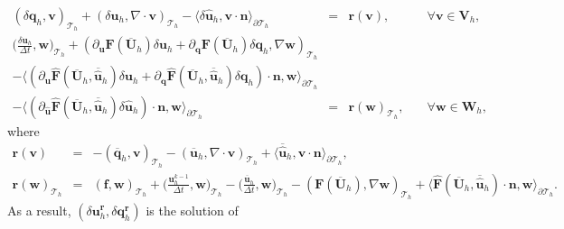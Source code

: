 \documentclass[11pt]{article}
\begin{document}
\begin{equation}
\begin{array}{rcll}
(\delta \bm{q}_h, \bm{v})_{\mathcal{T}_h} + (\delta \bm{u}_h, \nabla \cdot \bm{v})_{\mathcal{T}_h} - \langle \delta \widehat{\bm{u}}_h, \bm{v} \cdot \bm{n} \rangle_{\partial \mathcal{T}_h}  & = & \bm{r}(\bm{v}), & \quad \forall \bm{v} \in \bm{V}_h, \\[2ex] 
\displaystyle \Big(\frac{\delta \bm{u}_h}{\Delta t}, \bm{w} \Big)_{\mathcal{T}_h} + (\partial_{\bm{u}} \bm{F} (\overline{\bm{U}}_h) \delta \bm{u}_h + \partial_{\bm{q}} \bm{F} (\overline{\bm{U}}_h) \delta \bm{q}_h, \nabla \bm{w})_{\mathcal{T}_h} & & \\[2ex]
 - \langle (\partial_{\bm{u}} \widehat{\bm{F}} (\overline{\bm{U}}_h, \overline{\widehat{\bm{u}}}_h) \delta \bm{u}_h + \partial_{{\bm{q}}} \widehat{\bm{F}} (\overline{\bm{U}}_h, \overline{\widehat{\bm{u}}}_h) \delta {\bm{q}}_h) \cdot \bm{n}, \bm{w} \rangle_{\partial \mathcal{T}_h} & & \\[2ex]
 - \langle (\partial_{\widehat{\bm{u}}} \widehat{\bm{F}} (\overline{\bm{U}}_h, \overline{\widehat{\bm{u}}}_h) \delta \widehat{\bm{u}}_h) \cdot \bm{n}, \bm{w} \rangle_{\partial \mathcal{T}_h}   & = &  \bm{r}(\bm{w})_{\mathcal{T}_h},  & \quad \forall \bm{w} \in \bm{W}_h,
\end{array}
\end{equation}
where
\begin{equation}
\begin{array}{rcl}
 \bm{r}(\bm{v}) & = & -(\overline{\bm{q}}_h, \bm{v})_{\mathcal{T}_h} - (\overline{\bm{u}}_h, \nabla \cdot \bm{v})_{\mathcal{T}_h} + \langle \overline{\widehat{\bm{u}}}_h, \bm{v} \cdot \bm{n} \rangle_{\partial \mathcal{T}_h},  \\[2ex]
\bm{r}(\bm{w})_{\mathcal{T}_h} & = & (\bm{f}, \bm{w})_{\mathcal{T}_h} + \displaystyle \Big(\frac{\bm{u}_h^{k-1}}{\Delta t}, \bm{w} \Big)_{\mathcal{T}_h} - \Big(\frac{ \overline{\bm{u}}_h}{\Delta t}, \bm{w} \Big)_{\mathcal{T}_h}- (\bm{F} (\overline{\bm{U}}_h), \nabla \bm{w})_{\mathcal{T}_h} + \langle \widehat{\bm{F}} (\overline{\bm{U}}_h, \overline{\widehat{\bm{u}}}_h) \cdot \bm{n}, \bm{w} \rangle_{\partial \mathcal{T}_h} .
\end{array}
\end{equation}
As a result, $(\delta \bm{u}_h^{\bm{r}},\delta \bm{q}_h^{\bm{r}})$ is the solution of
\end{document}
